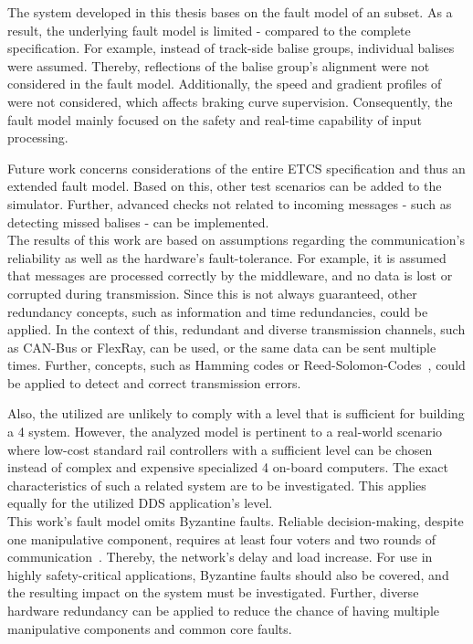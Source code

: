 The system developed in this thesis bases on the fault model of an  subset.
As a result, the underlying fault model is limited - compared to the complete  specification.
For example, instead of track-side balise groups, individual balises were assumed.
Thereby, reflections of the balise group's alignment were not considered in the fault model.
Additionally, the speed and gradient profiles of  were not considered, which affects braking curve supervision.
Consequently, the fault model mainly focused on the safety and real-time capability of input processing.

Future work concerns considerations of the entire ETCS specification and thus an extended fault model.
Based on this, other test scenarios can be added to the simulator.
Further, advanced checks not related to incoming messages - such as detecting missed balises - can be implemented.
\\

The results of this work are based on assumptions regarding the communication's reliability as well as the hardware's fault-tolerance.
For example, it is assumed that messages are processed correctly by the middleware, and no data is lost or corrupted during transmission.
Since this is not always guaranteed, other redundancy concepts, such as information and time redundancies, could be applied.
In the context of this, redundant and diverse transmission channels, such as CAN-Bus or FlexRay, can be used, or the same data can be sent multiple times.
Further,  concepts, such as Hamming codes or Reed-Solomon-Codes~\cite{ReedSolomonCodes}, could be applied to detect and correct transmission errors.

Also, the utilized  are unlikely to comply with a  level that is sufficient for building a  4 system.
However, the analyzed model is pertinent to a real-world scenario where low-cost standard rail controllers with a sufficient  level can be chosen instead of complex and expensive specialized  4 on-board computers.
The exact characteristics of such a related system are to be investigated.
This applies equally for the utilized DDS application's  level.
\\

This work's fault model omits Byzantine faults.
Reliable decision-making, despite one manipulative component, requires at least four voters and two rounds of communication~\cite{GamerIncreasingMOON}.
Thereby, the network's delay and load increase.
For use in highly safety-critical applications, Byzantine faults should also be covered, and the resulting impact on the system must be investigated.
Further, diverse hardware redundancy can be applied to reduce the chance of having multiple manipulative components and common core faults.

